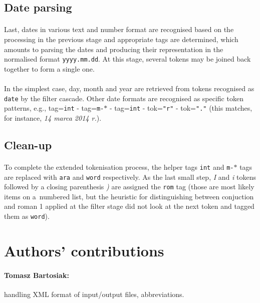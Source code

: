 \documentclass[oneside,12pt]{article}
\begin{document}
\subsection{Date parsing}

\paragraph{}
Last, dates in various text and number format are recognised based on the processing in the previous stage and appropriate tags are determined, which amounts to parsing the dates and producing their representation in the normalised format \texttt{yyyy.mm.dd}. At this stage, several tokens may be joined back together to form a single one.

\paragraph{}
In the simplest case, day, month and year are retrieved from tokens recognised as \texttt{date} by the filter cascade. Other date formats are recognised as specific token patterns, e.g., tag=\texttt{int} - tag=\texttt{m-$\ast$} - tag=\texttt{int} - tok=\texttt{"r"} - tok=\texttt{"."} (this matches, for instance, \textit{14 marca 2014 r.}).

\subsection{Clean-up}

\paragraph{}
To complete the extended tokenisation process, the helper tags \texttt{int} and \texttt{m-$\ast$} tags are replaced with \texttt{ara} and \texttt{word} respectively. As the last small step, \textit{I} and \textit{i} tokens followed by a closing parenthesis \textit{)} are assigned the \texttt{rom} tag (those are most likely items on a~numbered list, but the heuristic for distinguishing between conjuction and roman 1 applied at the filter stage did not look at the next token and tagged them as \texttt{word}).

\section{Authors' contributions}

\paragraph{Tomasz Bartosiak:} handling XML format of input/output files, abbreviations.
\end{document}
